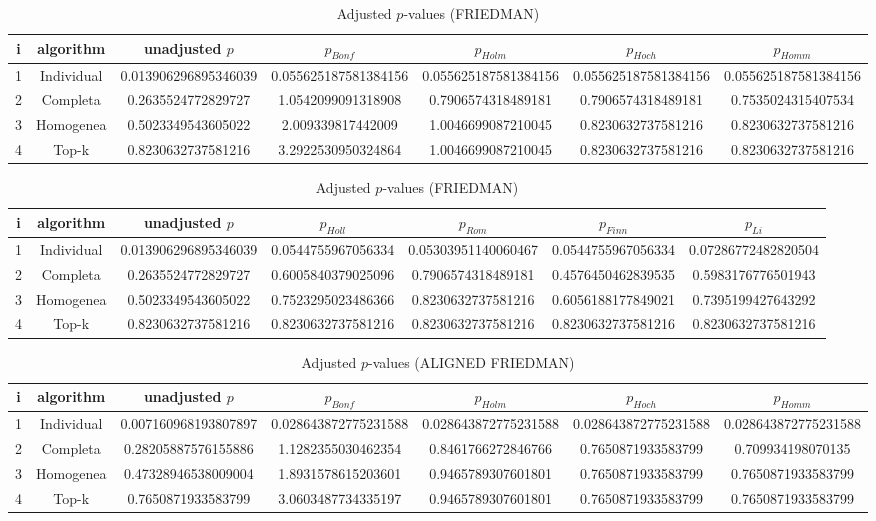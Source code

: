 \documentclass[a4paper,10pt]{article}
\begin{document}
\begin{landscape}
\begin{table}[!htp]
\centering\scriptsize
\caption{Adjusted $p$-values (FRIEDMAN)}
\begin{tabular}{ccccccc}
i&algorithm&unadjusted $p$&$p_{Bonf}$&$p_{Holm}$&$p_{Hoch}$&$p_{Homm}$\\
\hline
1&Individual&0.013906296895346039&0.055625187581384156&0.055625187581384156&0.055625187581384156&0.055625187581384156\\
2&Completa&0.2635524772829727&1.0542099091318908&0.7906574318489181&0.7906574318489181&0.7535024315407534\\
3&Homogenea&0.5023349543605022&2.009339817442009&1.0046699087210045&0.8230632737581216&0.8230632737581216\\
4&Top-k&0.8230632737581216&3.2922530950324864&1.0046699087210045&0.8230632737581216&0.8230632737581216\\
\hline
\end{tabular}
\end{table}

\begin{table}[!htp]
\centering\scriptsize
\caption{Adjusted $p$-values (FRIEDMAN)}
\begin{tabular}{ccccccc}
i&algorithm&unadjusted $p$&$p_{Holl}$&$p_{Rom}$&$p_{Finn}$&$p_{Li}$\\
\hline
1&Individual&0.013906296895346039&0.0544755967056334&0.05303951140060467&0.0544755967056334&0.07286772482820504\\
2&Completa&0.2635524772829727&0.6005840379025096&0.7906574318489181&0.4576450462839535&0.5983176776501943\\
3&Homogenea&0.5023349543605022&0.7523295023486366&0.8230632737581216&0.6056188177849021&0.7395199427643292\\
4&Top-k&0.8230632737581216&0.8230632737581216&0.8230632737581216&0.8230632737581216&0.8230632737581216\\
\hline
\end{tabular}
\end{table}


\newpage

\begin{table}[!htp]
\centering\scriptsize
\caption{Adjusted $p$-values (ALIGNED FRIEDMAN)}
\begin{tabular}{ccccccc}
i&algorithm&unadjusted $p$&$p_{Bonf}$&$p_{Holm}$&$p_{Hoch}$&$p_{Homm}$\\
\hline
1&Individual&0.007160968193807897&0.028643872775231588&0.028643872775231588&0.028643872775231588&0.028643872775231588\\
2&Completa&0.28205887576155886&1.1282355030462354&0.8461766272846766&0.7650871933583799&0.709934198070135\\
3&Homogenea&0.47328946538009004&1.8931578615203601&0.9465789307601801&0.7650871933583799&0.7650871933583799\\
4&Top-k&0.7650871933583799&3.0603487734335197&0.9465789307601801&0.7650871933583799&0.7650871933583799\\
\hline
\end{tabular}
\end{table}


\end{landscape}
\end{document}
